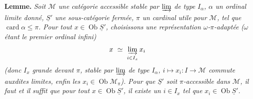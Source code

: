 \textbf{Lemme.} \textit{Soit $\mathcal{M}$ une catégorie accessible stable par $\mathop{\underrightarrow{\mathrm{lim}}}$ de type $I_\alpha$, $\alpha$ un ordinal limite donné, $\underline{S}'$ une sous-catégorie fermée, $\pi$ un cardinal utile}
\textit{pour $\mathcal{M}$, tel que} $\operatorname{card}\alpha\leqslant\pi$\textit{. Pour tout $x\in\operatorname{Ob}\underline{S}'$, choisissons une représentation $\omega$-$\pi$-adaptée ($\omega$ étant le premier ordinal infini)}
\[
x\ \simeq\ \limind_{i\in I_x}x_i
\]
\textit{(donc $I_x$ grande devant $\pi$, stable par $\mathop{\underrightarrow{\mathrm{lim}}}$ de type $I_\alpha$, $i\longmapsto x_i:I\longrightarrow\mathcal{M}$ commute auxdites limites, enfin les $x_i\in\operatorname{Ob}\mathcal{M}_\pi$). Pour que $\underline{S}'$ soit $\pi$-accessible dans $\mathcal{M}$, il faut et il suffit que pour tout $x\in\operatorname{Ob}\underline{S}'$, il existe un $i\in I_x$ tel que $x_i\in\operatorname{Ob}\underline{S}'$.}

